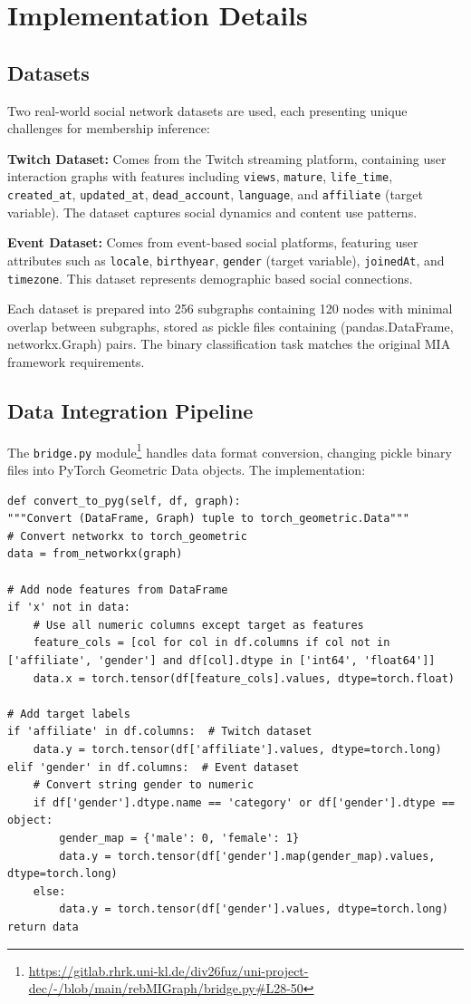 \documentclass{article}
\begin{document}
\section{Implementation Details}
\subsection{Datasets}
Two real-world social network datasets are used, each presenting unique challenges for membership inference:

\textbf{Twitch Dataset:} Comes from the Twitch streaming platform, containing user interaction graphs with features including \texttt{views}, \texttt{mature}, \texttt{life\_time}, \texttt{created\_at}, \texttt{updated\_at}, \texttt{dead\_account}, \texttt{language}, and \texttt{affiliate} (target variable). The dataset captures social dynamics and content use patterns.

\textbf{Event Dataset:} Comes from event-based social platforms, featuring user attributes such as \texttt{locale}, \texttt{birthyear}, \texttt{gender} (target variable), \texttt{joinedAt}, and \texttt{timezone}. This dataset represents demographic based social connections.

Each dataset is prepared into 256 subgraphs containing 120 nodes with minimal overlap between subgraphs, stored as pickle files containing (pandas.DataFrame, networkx.Graph) pairs. The binary classification task matches the original MIA framework requirements.

\subsection{Data Integration Pipeline}
The \texttt{bridge.py} module\footnote{\url{https://gitlab.rhrk.uni-kl.de/div26fuz/uni-project-dec/-/blob/main/rebMIGraph/bridge.py\#L28-50}} handles data format conversion, changing pickle binary files into PyTorch Geometric Data objects. The implementation:
\begin{verbatim}
def convert_to_pyg(self, df, graph):
"""Convert (DataFrame, Graph) tuple to torch_geometric.Data"""
# Convert networkx to torch_geometric
data = from_networkx(graph)

# Add node features from DataFrame
if 'x' not in data:
    # Use all numeric columns except target as features
    feature_cols = [col for col in df.columns if col not in ['affiliate', 'gender'] and df[col].dtype in ['int64', 'float64']]
    data.x = torch.tensor(df[feature_cols].values, dtype=torch.float)

# Add target labels
if 'affiliate' in df.columns:  # Twitch dataset
    data.y = torch.tensor(df['affiliate'].values, dtype=torch.long)
elif 'gender' in df.columns:  # Event dataset
    # Convert string gender to numeric
    if df['gender'].dtype.name == 'category' or df['gender'].dtype == object:
        gender_map = {'male': 0, 'female': 1}
        data.y = torch.tensor(df['gender'].map(gender_map).values, dtype=torch.long)
    else:
        data.y = torch.tensor(df['gender'].values, dtype=torch.long)
return data
\end{verbatim}
\end{document}
